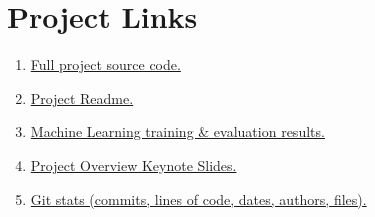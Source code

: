 \documentclass[12pt,letterpaper]{article}
\begin{document}
\section*{Project Links}

\begin{enumerate}
  \item \href{http://github.com/nrub/potato-peeler}{Full project source code.}
  \item \href{https://github.com/nrub/potato-peeler/blob/master/README.md}{Project Readme.}
  \item \href{https://github.com/nrub/potato-peeler/blob/master/models/current-model-results.txt}{Machine Learning training \& evaluation results.}
  \item \href{https://github.com/nrub/potato-peeler/blob/master/doc/data-inference-slides.key?raw=true}{Project Overview Keynote Slides.}
  \item \href{http://nrub.github.io/potato-peeler/}{Git stats (commits, lines of code, dates, authors, files).}
\end{enumerate}
\end{document}
